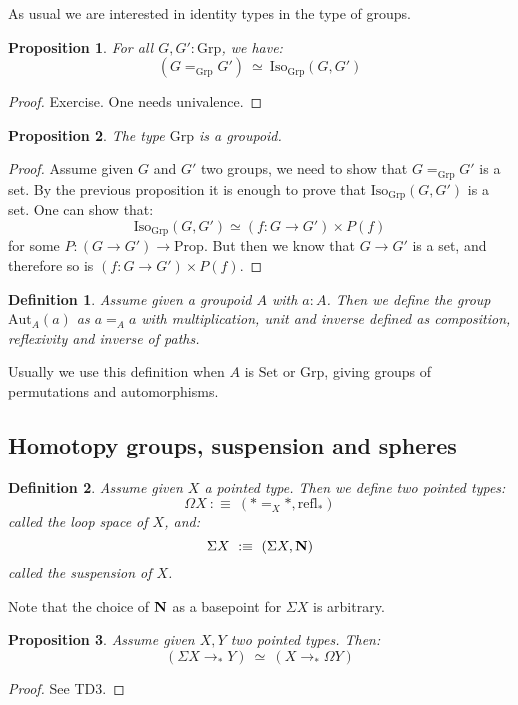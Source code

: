 \documentclass{article}
\newcommand{\sse}[1]{\medbreak \subsection{#1}}
\renewcommand{\r}{\rightarrow}
\newcommand{\refl}{\mathrm{refl}}
\newcommand{\N}{\mathrm{\bf N}}
\newcommand{\Grp}{\mathrm{Grp}}
\newcommand{\Iso}{\mathrm{Iso}}
\newcommand{\Aut}{\mathrm{Aut}}
\newcommand{\Set}{\mathrm{Set}}
\newcommand{\Prop}{\mathrm{Prop}}
\newtheorem{definition}{Definition}
\newtheorem{proposition}{Proposition}
\begin{document}
As usual we are interested in identity types in the type of groups.

\begin{proposition}
For all $G,G':\Grp$, we have:
\[(G=_{\Grp} G') \ \simeq \ \Iso_{\Grp}(G,G')\]
\end{proposition}
\begin{proof}
Exercise. One needs univalence.
\end{proof}

\begin{proposition}
The type $\Grp$ is a groupoid.
\end{proposition}
\begin{proof}
Assume given $G$ and $G'$ two groups, we need to show that $G=_\Grp G'$ is a set. By the previous proposition it is enough to prove that $ \Iso_{\Grp}(G,G')$ is a set. One can show that: 
\[\Iso_{\Grp}(G,G') \simeq (f:G\r G')\times P(f)\]
for some $P : (G\r G') \r \Prop$. But then we know that $G\r G'$ is a set, and therefore so is $(f:G\r G')\times P(f)$.
\end{proof}

\begin{definition}
Assume given a groupoid $A$ with $a:A$. Then we define the group $\Aut_A(a)$ as $a=_Aa$ with multiplication, unit and inverse defined as composition, reflexivity and inverse of paths.
\end{definition}

Usually we use this definition when $A$ is $\Set$ or $\Grp$, giving groups of permutations and automorphisms.



\sse{Homotopy groups, suspension and spheres}

\begin{definition}
Assume given $X$ a pointed type. Then we define two pointed types:
\[\Omega X \ :\equiv\ (*=_X* , \refl_*)\]
called the loop space of $X$, and:
\[\Sigma X \ :\equiv\ (\Sigma X , \N)\]
called the suspension of $X$.
\end{definition}

Note that the choice of $\N$ as a basepoint for $\Sigma X$ is arbitrary.

\begin{proposition}
Assume given $X,Y$ two pointed types. Then:
\[(\Sigma X \r_* Y)\ \simeq\ (X\r_*\Omega Y)\]
\end{proposition}
\begin{proof}
See TD3.
\end{proof}
\end{document}
